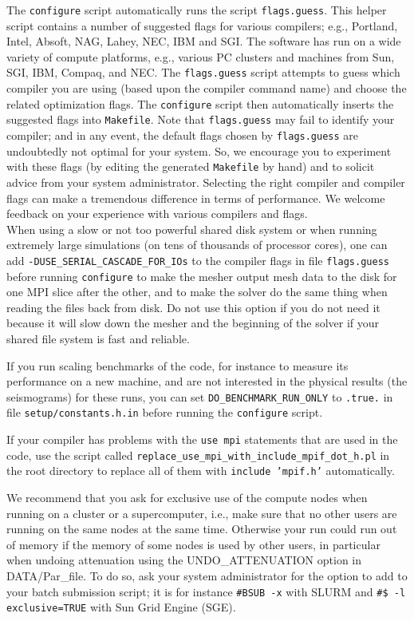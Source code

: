 The \texttt{configure} script automatically runs the script \texttt{flags.guess}.
This helper script contains a number of suggested flags for various
compilers; e.g., Portland, Intel, Absoft, NAG, Lahey, NEC, IBM and
SGI. The software has run on a wide variety of compute platforms,
e.g., various PC clusters and machines from Sun, SGI, IBM, Compaq,
and NEC. The \texttt{flags.guess} script attempts to guess which compiler
you are using (based upon the compiler command name) and choose the
related optimization flags. The \texttt{configure} script then automatically
inserts the suggested flags into \texttt{Makefile}. Note that \texttt{flags.guess}
may fail to identify your compiler; and in any event, the default
flags chosen by \texttt{flags.guess} are undoubtedly not optimal for
your system. So, we encourage you to experiment with these flags (by
editing the generated \texttt{Makefile} by hand) and to solicit advice
from your system administrator. Selecting the right compiler and compiler
flags can make a tremendous difference in terms of performance. We
welcome feedback on your experience with various compilers and flags.\\


When using a slow or not too powerful shared disk system or when running extremely large simulations
(on tens of thousands of processor cores), one can add \texttt{-DUSE\_SERIAL\_CASCADE\_FOR\_IOs} to the compiler flags
in file \texttt{flags.guess} before running \texttt{configure} to make the mesher output mesh data
to the disk for one MPI slice after the other, and to make the solver do the same thing when reading the files back from disk.
Do not use this option if you do not need it because it will slow down the mesher and the beginning of the solver if your
shared file system is fast and reliable.


If you run scaling benchmarks of the code, for instance to measure its performance on a new machine, and are not interested in the physical results
(the seismograms) for these runs, you can set \texttt{DO\_BENCHMARK\_RUN\_ONLY} to \texttt{.true.} in file \texttt{setup/constants.h.in} before running the \texttt{configure} script.


If your compiler has problems with the \texttt{use mpi} statements that are used in the code, use the script called
\texttt{replace\_use\_mpi\_with\_include\_mpif\_dot\_h.pl} in the root directory to replace all of them with \texttt{include 'mpif.h'} automatically.


We recommend that you ask for exclusive use of the compute nodes when running on a cluster or a supercomputer, i.e., make sure that no other users
are running on the same nodes at the same time. Otherwise your run could run out of memory if the memory of some nodes is used by other users, in particular
when undoing attenuation using the UNDO\_ATTENUATION option in DATA/Par\_file.
To do so, ask your system administrator for the option to add to your batch submission script; it is for instance
\texttt{\#BSUB -x} with SLURM and \texttt{\#\$ -l exclusive=TRUE} with Sun Grid Engine (SGE).



